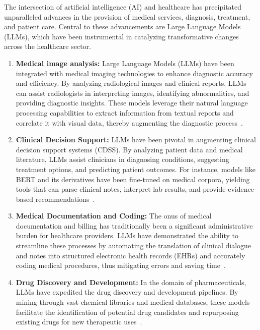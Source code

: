 The intersection of artificial intelligence (AI) and healthcare has precipitated unparalleled advances in the provision of medical services, diagnosis, treatment, and patient care.
Central to these advancements are Large Language Models (LLMs), which have been instrumental in catalyzing transformative changes across the healthcare sector.

\begin{enumerate}
    \item \textbf{Medical image analysis:}{
        Large Language Models (LLMs) have been integrated with medical imaging technologies to enhance diagnostic accuracy and efficiency.
        By analyzing radiological images and clinical reports, LLMs can assist radiologists in interpreting images, identifying abnormalities, and providing diagnostic insights.
        These models leverage their natural language processing capabilities to extract information from textual reports and correlate it with visual data, thereby augmenting the diagnostic process~\cite{li2021survey, zhang2021medical}.
    }

    \item \textbf{Clinical Decision Support:}{
        LLMs have been pivotal in augmenting clinical decision support systems (CDSS). By analyzing patient data and medical literature, LLMs assist clinicians in diagnosing conditions, suggesting treatment options, and predicting patient outcomes. For instance, models like BERT and its derivatives have been fine-tuned on medical corpora, yielding tools that can parse clinical notes, interpret lab results, and provide evidence-based recommendations~\cite{alsentzer2019publicly}.
    }

    \item \textbf{Medical Documentation and Coding:}{
        The onus of medical documentation and billing has traditionally been a significant administrative burden for healthcare providers. LLMs have demonstrated the ability to streamline these processes by automating the translation of clinical dialogue and notes into structured electronic health records (EHRs) and accurately coding medical procedures, thus mitigating errors and saving time~\cite{shickel2018deep}.
    }

    \item \textbf{Drug Discovery and Development:}{
        In the domain of pharmaceuticals, LLMs have expedited the drug discovery and development pipelines. By mining through vast chemical libraries and medical databases, these models facilitate the identification of potential drug candidates and repurposing existing drugs for new therapeutic uses~\cite{zhavoronkov2019deep}.
    }


\end{enumerate}
